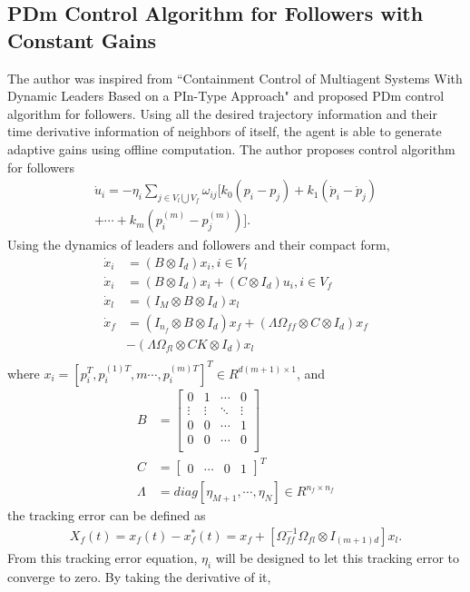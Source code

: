 \subsection{PDm Control Algorithm for Followers with Constant Gains} \label{PDm_Control_Algorithm_Followers_with_constant_gains}
 The author was inspired from ``Containment Control of Multiagent Systems With Dynamic Leaders Based on a PIn-Type Approach"\cite{7322205} and proposed PDm control algorithm for followers. Using all the desired trajectory information and their time derivative information of neighbors of itself, the agent is able to generate adaptive gains using offline computation. The author proposes control algorithm for followers
 \begin{align*}
   \dot u_i = -\eta_i \sum_{j \in V_l\bigcup V_f } \omega_{ij}[k_0(p_i-p_j) + k_1(\dot p_i-\dot p_j) \\+ \cdots +k_m( p_i^{(m)}- p_j^{(m)})].
 \end{align*}
 Using the dynamics of leaders and followers and their compact form,
 \begin{align*}
   \dot x_i & = (B \otimes I_d)x_i,  i \in V_l\\
   \dot x_i & = (B \otimes I_d)x_i + (C \otimes I_d)u_i,  i \in V_f\\
   \dot x_l & = (I_M\otimes B \otimes I_d)x_l\\
   \dot x_f & = (I_{n_f}\otimes B \otimes I_d)x_f + (\Lambda \Omega_{ff}\otimes C \otimes I_d)x_f\\
   &- (\Lambda \Omega_{fl} \otimes CK \otimes I_d) x_l\\
 \end{align*}
   where $x_i = [p_i^T,p_i^{(1)T},m  \cdots , p_i^{(m)T}]^T \in R^{d(m+1)\times 1}$, and
 \begin{align*}
   B &= \begin{bmatrix}
      0 & 1 & \cdots & 0\\
      \vdots & \vdots &\ddots &\vdots\\
      0 & 0 & \cdots &1\\
      0 & 0 & \cdots &0 \\
   \end{bmatrix}\\
   C &= \begin{bmatrix}
      0 & \cdots & 0 & 1 
   \end{bmatrix}^T\\
   \Lambda &= diag{[\eta_{M+1}, \cdots , \eta_{N}]} \in R ^{n_f \times n_f}
 \end{align*}
 the tracking error can be defined as
 \begin{align*}
   X_f(t) = x_f(t) - x_f^*(t) = x_f + [\Omega_{ff}^{-1} \Omega_{fl} \otimes I_{(m+1)d}]x_l.
 \end{align*}
 From this tracking error equation, $\eta_i$ will be designed to let this tracking error to converge to zero. By taking the derivative of it,

